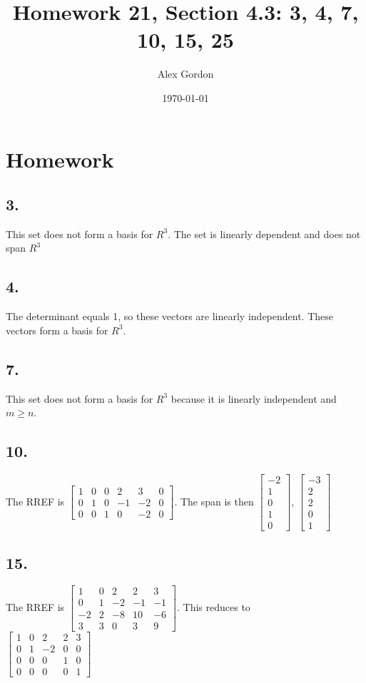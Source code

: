 \documentclass[12]{scrartcl}
\begin{document}
\title{Homework 21, Section 4.3: 3, 4, 7, 10, 15, 25}
\author{Alex Gordon}
\date{\today}
\maketitle
\section*{Homework}
\subsection*{3.}
This set does not form a basis for $R^3$. The set is linearly dependent and does not span $R^3$
\subsection*{4.}
The determinant equals 1, so these vectors are linearly independent. These vectors form a basis for $R^3$. 
\subsection*{7. }
This set does not form a basis for $R^3$ because it is linearly independent and  $m \geq n$. 
\subsection*{10.}
The RREF is $ \begin{bmatrix}  1 & 0 & 0 & 2 & 3 & 0 \\ 0 & 1 & 0 & -1 & -2 & 0 \\ 0 & 0 & 1 & 0 & -2 & 0  \end{bmatrix} $. The span is then $ \begin{bmatrix}  -2 \\ 1 \\ 0 \\ 1 \\ 0  \end{bmatrix} $, $ \begin{bmatrix}  -3 \\ 2 \\ 2 \\ 0 \\ 1  \end{bmatrix} $
\subsection*{15.}
The RREF is $ \begin{bmatrix}  1 & 0 & 2 & 2 & 3 \\ 0 & 1 & -2 & -1 & -1 \\ -2 & 2 & -8 & 10 & -6 \\ 3 & 3 & 0 & 3 & 9   \end{bmatrix} $. This reduces to \\
$ \begin{bmatrix}  1 & 0 & 2 & 2 & 3 \\ 0 & 1 & -2 & 0 & 0 \\ 0 & 0 & 0 & 1 & 0 \\ 0 & 0 & 0 & 0 & 1 \end{bmatrix}    $
\end{document}
